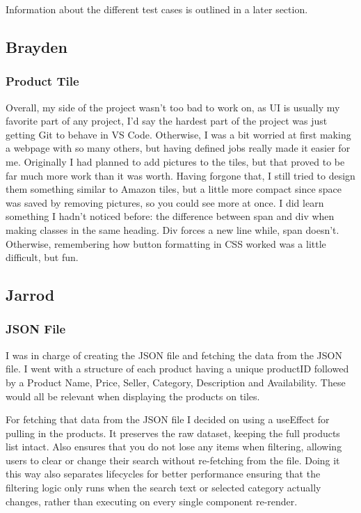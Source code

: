 \documentclass{article}[12pt]
\begin{document}
Information about the different test cases is outlined in a later section.


\subsection{Brayden}
\subsubsection{Product Tile}
Overall, my side of the project wasn't too bad to work on, as UI is usually my favorite part of any project, I'd say the hardest part of the project was just getting Git to behave in VS Code. Otherwise, I was a bit worried at first making a webpage with so many others, but having defined jobs really made it easier for me. Originally I had planned to add pictures to the tiles, but that proved to be far much more work than it was worth. Having forgone that, I still tried to design them something similar to Amazon tiles, but a little more compact since space was saved by removing pictures, so you could see more at once. I did learn something I hadn't noticed before: the difference between span and div when making classes in the same heading. Div forces a new line while, span doesn't. Otherwise, remembering how button formatting in CSS worked was a little difficult, but fun.
\subsection{Jarrod}
\subsubsection{JSON File}
I was in charge of creating the JSON file and fetching the data from the JSON file. I went with a structure of each product having a unique productID followed by a Product Name, Price, Seller, Category, Description and Availability. These would all be relevant when displaying the products on tiles.

For fetching that data from the JSON file I decided on using a useEffect for pulling in the products. It preserves the raw dataset, keeping the full products list intact. Also ensures that you do not lose any items when filtering, allowing users to clear or change their search without re-fetching from the file. Doing it this way also separates lifecycles for better performance ensuring that the filtering logic only runs when the search text or selected category actually changes, rather than executing on every single component re-render.
\end{document}

